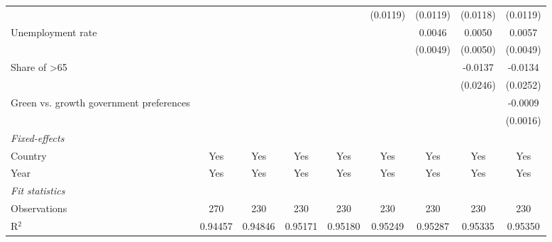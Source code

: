 \begin{table}[htbp]
\begin{tabular}{lcccccccc}
                                                                      &          &          &                &                & (0.0119)       & (0.0119)       & (0.0118)        & (0.0119)\\   
      Unemployment rate                                               &          &          &                &                &                & 0.0046         & 0.0050          & 0.0057\\   
                                                                      &          &          &                &                &                & (0.0049)       & (0.0050)        & (0.0049)\\   
      Share of >65                                                    &          &          &                &                &                &                & -0.0137         & -0.0134\\   
                                                                      &          &          &                &                &                &                & (0.0246)        & (0.0252)\\   
      Green vs. growth government preferences                         &          &          &                &                &                &                &                 & -0.0009\\   
                                                                      &          &          &                &                &                &                &                 & (0.0016)\\   
      \midrule
      \emph{Fixed-effects}\\
      Country                                                         & Yes      & Yes      & Yes            & Yes            & Yes            & Yes            & Yes             & Yes\\  
      Year                                                            & Yes      & Yes      & Yes            & Yes            & Yes            & Yes            & Yes             & Yes\\  
      \midrule
      \emph{Fit statistics}\\
      Observations                                                    & 270      & 230      & 230            & 230            & 230            & 230            & 230             & 230\\  
      R$^2$                                                           & 0.94457  & 0.94846  & 0.95171        & 0.95180        & 0.95249        & 0.95287        & 0.95335         & 0.95350\\  

\end{tabular}
\end{table}
